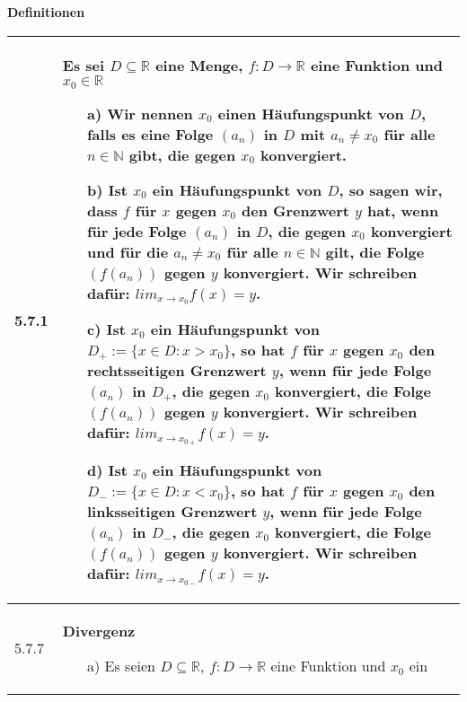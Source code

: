     \noindent
    \textbf{Definitionen}
    \begin{table}[H]  
    \begin{tabularx}{\textwidth}{X m{16cm}}
        \toprule

        5.7.1 & Es sei $D \subseteq \mathbb{R}$ eine Menge, $f: D \rightarrow \mathbb{R}$ eine Funktion und $x_0 \in \mathbb{R}$
                \begin{itemize}
                    \item[a)] Wir nennen $x_0$ einen \textbf{Häufungspunkt} von $D$, falls es eine Folge $(a_n)$ in $D$ mit
                                $a_n \neq x_0$ für alle $n \in \mathbb{N}$ gibt, die gegen $x_0$ konvergiert.
                    \item[b)] Ist $x_0$ ein Häufungspunkt von $D$, so sagen wir, dass $f$ für $x$ gegen $x_0$ den Grenzwert 
                                $y$ hat, wenn für jede Folge $(a_n)$ in $D$, die gegen $x_0$ konvergiert und für die
                                $a_n \neq x_0$ für alle $n \in \mathbb{N}$ gilt, die Folge $(f(a_n))$ gegen $y$ konvergiert.
                                \hfill \break Wir schreiben dafür: $lim_{x \rightarrow x_0} f(x) = y$.
                    \item[c)] Ist $x_0$ ein Häufungspunkt von $D_+ := \{ x \in D : x > x_0\}$, so hat $f$ für $x$ gegen $x_0$
                                den \textbf{rechtsseitigen Grenzwert} $y$, wenn für jede Folge $(a_n)$ in $D_+$, die gegen
                                $x_0$ konvergiert, die Folge $(f(a_n))$ gegen $y$ konvergiert.
                                \hfill \break Wir schreiben dafür: $lim_{x \rightarrow x_{0+}} f(x) = y$.
                    \item[d)] Ist $x_0$ ein Häufungspunkt von $D_- := \{ x \in D : x < x_0\}$, so hat $f$ für $x$ gegen $x_0$
                                den \textbf{linksseitigen Grenzwert} $y$, wenn für jede Folge $(a_n)$ in $D_-$, die gegen
                                $x_0$ konvergiert, die Folge $(f(a_n))$ gegen $y$ konvergiert.
                                \hfill \break Wir schreiben dafür: $lim_{x \rightarrow x_{0-}} f(x) = y$.
                \end{itemize} \\
        \midrule
        5.7.7 & \textbf{Divergenz}
                \begin{itemize}
                    \item[a)] Es seien $D \subseteq \mathbb{R}$, $f: D \rightarrow \mathbb{R}$ eine Funktion und $x_0$ ein

\end{itemize}
\end{tabularx}
\end{table}
